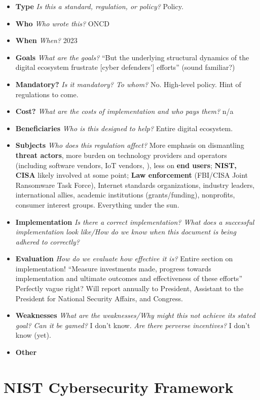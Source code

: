 \documentclass[11pt]{article}
\begin{document}
\begin{itemize}
    \item {\bf Type} {\it Is this a standard, regulation, or policy?} Policy.
    \item {\bf Who} {\it Who wrote this?} ONCD
    \item {\bf When} {\it When?} 2023
    \item {\bf Goals} {\it What are the goals?} ``But the underlying structural dynamics of the digital ecosystem frustrate [cyber defenders'] efforts'' (sound familiar?)
    \item {\bf Mandatory?} {\it Is it mandatory? To whom?} No. High-level policy. Hint of regulations to come.
    \item {\bf Cost?} {\it What are the costs of implementation and who pays them?} n/a
    \item {\bf Beneficiaries} {\it Who is this designed to help?} Entire digital ecosystem.
    \item {\bf Subjects} {\it Who does this regulation affect?} More emphasis on dismantling {\bf threat actors}, more burden on {technology providers and operators} (including software vendors, IoT vendors, ), less on {\bf end users}; {\bf NIST, CISA} likely involved at some point; {\bf Law enforcement} (FBI/CISA Joint Ransomware Task Force), Internet standards organizations, industry leaders, international allies, academic institutions (grants/funding), nonprofits, consumer interest groups. Everything under the sun.
    \item {\bf Implementation} {\it Is there a correct implementation? What does a successful implementation look like/How do we know when this document is being adhered to correctly?}
    \item {\bf Evaluation} {\it How do we evaluate how effective it is?} Entire section on implementation! ``Measure investments made, progress towards implementation and ultimate outcomes and effectiveness of these efforts'' Perfectly vague right? Will report annually to President, Assistant to the President for National Security Affairs, and Congress. 
    \item {\bf Weaknesses} {\it What are the weaknesses/Why might this not achieve its stated goal? Can it be gamed?} I don't know. {\it Are there perverse incentives?} I don't know (yet).
    \item {\bf Other}
\end{itemize}

\section{NIST Cybersecurity Framework}
\end{document}
